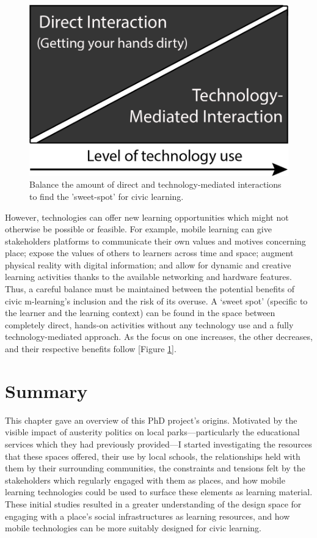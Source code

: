 \begin{figure}
  \centering
  \includegraphics[width=0.45\columnwidth]{images/chapter04/techBalance.png}
  \caption[Balancing technology use]{Balance the amount of direct and technology-mediated interactions to find the 'sweet-spot' for civic learning.}
  \label{fig:techBalance}
\end{figure}

However, technologies can offer new learning opportunities which might not otherwise be possible or feasible. For example, mobile learning can give stakeholders platforms to communicate their own values and motives concerning place; expose the values of others to learners across time and space; augment physical reality with digital information; and allow for dynamic and creative learning activities thanks to the available networking and hardware features. Thus, a careful balance must be maintained between the potential benefits of civic m-learning’s inclusion and the risk of its overuse. A `sweet spot' (specific to the learner and the learning context) can be found in the space between completely direct, hands-on activities without any technology use and a fully technology-mediated approach. As the focus on one increases, the other decreases, and their respective benefits follow [Figure \ref{fig:techBalance}]. 

\section{Summary}

This chapter gave an overview of this PhD project's origins. Motivated by the visible impact of austerity politics on local parks---particularly the educational services which they had previously provided---I started investigating the resources that these spaces offered, their use by local schools, the relationships held with them by their surrounding communities, the constraints and tensions felt by the stakeholders which regularly engaged with them as places, and how mobile learning technologies could be used to surface these elements as learning material. These initial studies resulted in a greater understanding of the design space for engaging with a place's social infrastructures as learning resources, and how mobile technologies can be more suitably designed for civic learning.

